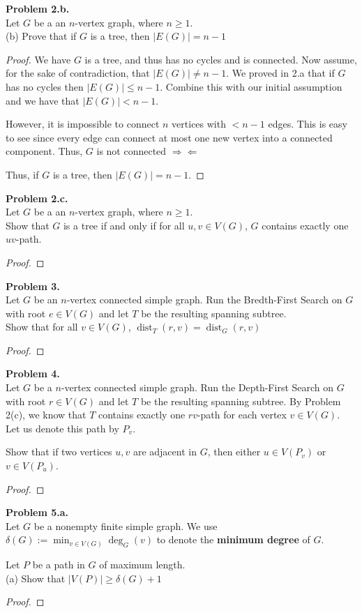 \documentclass{article}
\newcommand{\contradiction}{\Rightarrow\!\Leftarrow}
\DeclareMathOperator*{\dist}{dist}
\newenvironment{hwproof}[2]
{
    \textbf{Problem #1.}\\
    #2
    \begin{proof}
}{
    \end{proof}
}
\begin{document}
\begin{hwproof}{2.b}{
        Let $G$ be a an $n$-vertex graph, where $n \geq 1$.\\
        (b) Prove that if $G$ is a tree, then $|E(G)| = n - 1$
    }
    We have $G$ is a tree, and thus has no cycles and is connected. Now assume, for the sake
    of contradiction, that $|E(G)| \neq n - 1$. We proved in 2.a that if $G$ has no cycles then
    $|E(G)| \leq n - 1$. Combine this with our initial assumption and we have that
    $|E(G)| < n - 1$.

    However, it is impossible to connect $n$ vertices with $< n - 1$ edges. This is easy to see
    since every edge can connect at most one new vertex into a connected component. Thus, $G$
    is not connected $\contradiction$

    Thus, if $G$ is a tree, then $|E(G)| = n -1$.
\end{hwproof}

\begin{hwproof}{2.c}{
        Let $G$ be a an $n$-vertex graph, where $n \geq 1$.\\
        Show that $G$ is a tree if and only if for all $u,v \in V(G)$, $G$ contains
        exactly one $uv$-path.
    }
\end{hwproof}

\begin{hwproof}{3}{
        Let $G$ be an $n$-vertex connected simple graph. Run the Bredth-First Search
        on $G$ with root $e \in V(G)$ and let $T$ be the resulting spanning subtree.\\
        Show that for all $v \in V(G)$, $\dist_T(r,v) = \dist_G(r,v)$
    }
\end{hwproof}

\begin{hwproof}{4}
    {
        Let $G$ be a $n$-vertex connected simple graph. Run the Depth-First Search
        on $G$ with root $r \in V(G)$ and let $T$ be the resulting spanning subtree.
        By Problem 2(c), we know that $T$ contains exactly one $rv$-path for each vertex
        $v \in V(G)$. Let us denote this path by $P_v$.

        Show that if two vertices $u, v$ are adjacent in $G$, then either $u \in V(P_v)$
        or $v \in V(P_u)$.
    }
\end{hwproof}

\begin{hwproof}
    {5.a}
    {
        Let $G$ be a nonempty finite simple graph. We use
        $\delta(G) := \min_{v \in V(G)}\deg_G(v)$ to denote the \textbf{minimum degree}
        of $G$.

        Let $P$ be a path in $G$ of maximum length.\\
        (a) Show that $|V(P)| \geq \delta(G) + 1$

    }
\end{hwproof}
\end{document}
